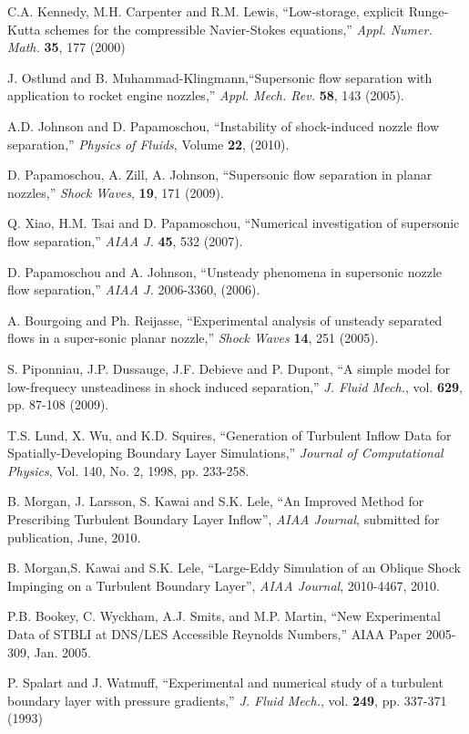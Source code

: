 \documentclass[]{aiaa-tc}%
\begin{document}
\begin{thebibliography}{10}
 	C.A. Kennedy, M.H. Carpenter and R.M. Lewis, ``Low-storage, explicit Runge-Kutta schemes for the compressible Navier-Stokes equations,'' \emph{Appl. Numer. Math.} {\bf 35}, 177 (2000) 
 
 	J. Ostlund and B. Muhammad-Klingmann,``Supersonic flow separation with application to rocket engine nozzles,'' \emph{Appl. Mech. Rev.} {\bf 58}, 143 (2005).
 
 	A.D. Johnson and D. Papamoschou, ``Instability of shock-induced nozzle flow separation,'' \emph{Physics of Fluids}, Volume {\bf 22}, (2010).
	
 	D. Papamoschou, A. Zill, A. Johnson, ``Supersonic flow separation in planar nozzles,'' \emph{Shock Waves}, {\bf 19}, 171 (2009).

 	Q. Xiao, H.M. Tsai and D. Papamoschou, ``Numerical investigation of supersonic flow separation,'' \emph{AIAA J.} {\bf 45}, 532 (2007).
	
 	D. Papamoschou and A. Johnson, ``Unsteady phenomena in supersonic nozzle flow separation,'' \emph{AIAA J.} 2006-3360, (2006).
	
 	A. Bourgoing and Ph. Reijasse, ``Experimental analysis of unsteady separated flows in a super-sonic planar nozzle,'' \emph{Shock Waves} {\bf 14}, 251 (2005).
	
 	S. Piponniau, J.P. Dussauge, J.F. Debieve and P. Dupont, ``A simple model for low-frequecy unsteadiness in shock induced separation,'' \emph{J. Fluid Mech.}, vol. {\bf 629}, pp. 87-108 (2009).
	
 	T.S. Lund, X. Wu, and K.D. Squires, ``Generation of Turbulent Inflow Data for Spatially-Developing Boundary Layer 
Simulations,'' \emph{Journal of Computational Physics}, Vol. 140, No. 2, 1998, pp. 233-258.

 	B. Morgan, J. Larsson, S. Kawai and S.K. Lele, ``An Improved Method for Prescribing Turbulent Boundary Layer 
Inflow'', \emph{AIAA Journal}, submitted for publication, June, 2010.

 	B. Morgan,S. Kawai and S.K. Lele, ``Large-Eddy Simulation of an Oblique Shock Impinging on a 
Turbulent Boundary Layer'', \emph{AIAA Journal}, 2010-4467, 2010.
 	
 	P.B. Bookey, C. Wyckham, A.J. Smits, and M.P. Martin, ``New Experimental Data of STBLI at DNS/LES Accessible 
Reynolds Numbers,''  AIAA Paper 2005-309, Jan. 2005.

	P. Spalart and J. Watmuff, ``Experimental and numerical study of a turbulent boundary layer with pressure gradients,'' \emph{J. Fluid Mech.},
vol. {\bf 249}, pp. 337-371 (1993)	

 
	
\end{thebibliography}
\end{document}
